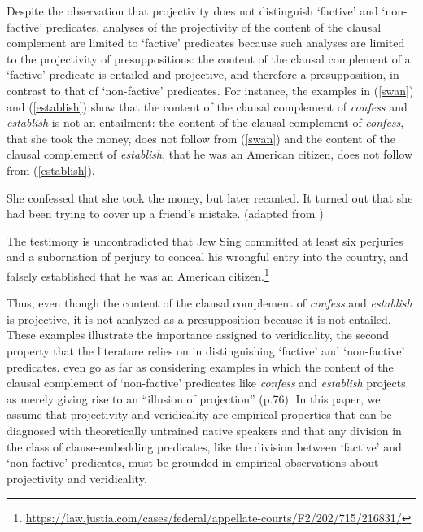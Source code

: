 \documentclass[11pt,fleqn]{article}
\newcommand{\6}{\mbox{$[\hspace*{-.6mm}[$}}
\newcommand{\9}{\mbox{$]\hspace*{-.6mm}]$}}
\begin{document}
Despite the observation that projectivity does not distinguish `factive' and `non-factive' predicates, analyses of the projectivity of the content of the clausal complement are limited to `factive' predicates because such analyses are limited to the projectivity of presuppositions: the content of the clausal complement of a `factive' predicate is entailed and projective, and therefore a presupposition, in contrast to that of `non-factive' predicates. For instance, the examples in (\ref{swan}) and (\ref{establish}) show that the content of the clausal complement of {\em confess} and {\em establish} is not an entailment: the content of the clausal complement of {\em confess}, that she took the money, does not follow from (\ref{swan}) and the content of the clausal complement of {\em establish}, that he was an American citizen, does not follow from (\ref{establish}). 

\begin{exe}
\ex\label{swan} She confessed that she took the money, but later recanted. It turned out that she had been trying to cover up a friend's mistake. \hfill (adapted from \citealt[1540]{swanson2012})

\ex\label{establish} The testimony is uncontradicted that Jew Sing committed at least six perjuries and a subornation of perjury to conceal his wrongful entry into the country, and falsely established that he was an American citizen.\footnote{\url{https://law.justia.com/cases/federal/appellate-courts/F2/202/715/216831/}}

\end{exe}
Thus, even though the content of the clausal complement of {\em confess} and {\em establish} is projective, it is not analyzed as a presupposition because it is not entailed. These examples illustrate the importance assigned to veridicality, the second property that the literature relies on in distinguishing `factive' and `non-factive' predicates. \citet{anand-hacquard2014} even go as far as considering examples in which the content of the clausal complement of `non-factive' predicates like {\em confess} and {\em establish} projects as merely giving rise to an ``illusion of projection'' (p.76). In this paper, we assume that projectivity and veridicality are empirical properties that can be diagnosed with theoretically untrained native speakers and that any division in the class of clause-embedding predicates, like the division between `factive' and `non-factive' predicates, must be grounded in empirical observations about projectivity and veridicality. 
\end{document}
